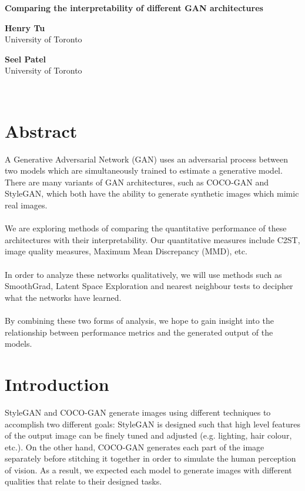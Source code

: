 \documentclass[12pt]{article}
\begin{document}
    \begin{center}
        \textbf{Comparing the interpretability of different GAN architectures}
    \end{center}
    \begin{minipage}{.5\textwidth}
        \centering
        \textbf{Henry Tu}\\
        University of Toronto
    \end{minipage}
    \begin{minipage}{.5\textwidth}
        \centering
        \textbf{Seel Patel}\\
        University of Toronto
    \end{minipage}
    \\

    \begin{multicols*}{2}
        \raggedcolumns

        \section{Abstract}
        \label{sec:abstract}
        A Generative Adversarial Network (GAN) uses an adversarial process between two models which are simultaneously trained to estimate a generative model.\cite{gan}
        There are many variants of GAN architectures, such as COCO-GAN\cite{cocogan} and StyleGAN\cite{stylegan}, which both have the ability to generate synthetic images which mimic real images.\\\\
        We are exploring methods of comparing the quantitative performance of these architectures with their interpretability.
        Our quantitative measures include C2ST\cite{evaluateGANs}, image quality measures\cite{evaluateGANs}, Maximum Mean Discrepancy (MMD)\cite{evaluateGANs}, etc.\\\\
        In order to analyze these networks qualitatively, we will use methods such as SmoothGrad\cite{smoothgrad}, Latent Space Exploration\cite{sampleGAN} and nearest neighbour tests\cite{evaluateGANs} to decipher what the networks have learned.\\\\
        By combining these two forms of analysis, we hope to gain insight into the relationship between performance metrics and the generated output of the models.

        \section{Introduction}
        \label{sec:introduction}
        StyleGAN and COCO-GAN generate images using different techniques to accomplish two different goals: StyleGAN is designed such that high level features of the output image can be finely tuned and adjusted (e.g. lighting, hair colour, etc.)\cite{stylegan}.
        On the other hand, COCO-GAN generates each part of the image separately before stitching it together in order to simulate the human perception of vision\cite{cocogan}.
        As a result, we expected each model to generate images with different qualities that relate to their designed tasks.

\end{multicols*}
\end{document}

